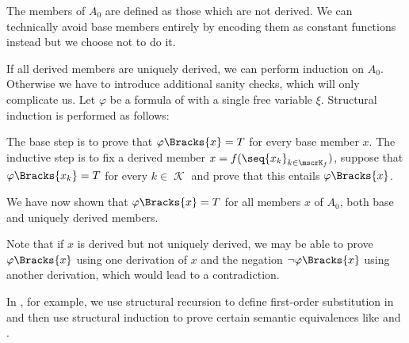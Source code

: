 \begin{remark}
  The  members of \( A_0 \) are defined as those which are not derived. We can technically avoid base members entirely by encoding them as constant functions instead but we choose not to do it.

  If all derived members are uniquely derived, we can perform induction on \( A_0 \). Otherwise we have to introduce additional sanity checks, which will only complicate us. Let \( \varphi \) be a formula of  with a single free variable \( \xi \). Structural induction is performed as follows:
  \begin{thmenum}
     The base step is to prove that \( \varphi\Bracks{x} = T \) for every base member \( x \).
     The inductive step is to fix a derived member \( x = f(\seq{ x_k }_{k \in \mscrK_f}) \), suppose that \( \varphi\Bracks{x_k} = T \) for every \( k \in \mscrK \) and prove that this entails \( \varphi\Bracks{x} \).

     We have now shown that \( \varphi\Bracks{x} = T \) for all members \( x \) of \( A_0 \), both base and uniquely derived members.

    Note that if \( x \) is derived but not uniquely derived, we may be able to prove \( \varphi\Bracks{x} \) using one derivation of \( x \) and the negation \( \neg\varphi\Bracks{x} \) using another derivation, which would lead to a contradiction.
  \end{thmenum}

  In , for example, we use structural recursion to define first-order substitution in  and then use structural induction to prove certain semantic equivalences like  and .
\end{remark}

